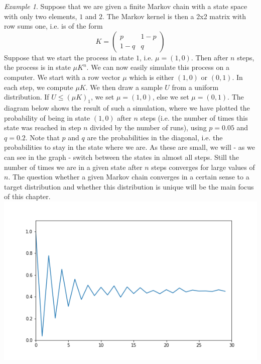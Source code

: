 \documentclass[a4paper, draft]{article}
\theoremstyle{own}
\theoremstyle{remark}
\newtheorem{example}{Example}[section]
\begin{document}
\begin{example}
Suppose that we are given a finite Markov chain with a state space with only two elements, $1$ and $2$. The Markov kernel is then a 2x2 matrix with row sums one, i.e. is of the form
$$
K = \begin{pmatrix} p & 1-p \\ 1-q & q \end{pmatrix}
$$
Suppose that we start the process in state $1$, i.e. $\mu = (1,0)$. Then after $n$ steps, the process is in state $\mu K^n$. We can now easily simulate this process on a computer. We start with a row vector $\mu$ which is either $(1,0)$ or $(0,1)$. In each step, we compute $\mu K$. We then draw a sample $U$ from a uniform distribution. If $U \leq (\mu K)_1$, we set $\mu = (1,0)$, else we set $\mu = (0,1)$.  The diagram below shows the result of such a simulation, where we have plotted the probability of being in state $(1,0)$ after $n$ steps (i.e. the number of times this state was reached in step $n$ divided by the number of runs), using $p = 0.05$ and $q = 0.2$. Note that $p$ and $q$ are the probabilities in the diagonal, i.e. the probabilities to stay in the state where we are. As these are small, we will - as we can see in the graph - switch between the states in almost all steps. Still the number of times we are in a given state after $n$ steps converges for large values of $n$. The question whether a given Markov chain converges in a certain sense to a target distribution and whether this distribution is unique will be the main focus of this chapter.
\includegraphics[scale=.55]{TwoDimensionalMarkovChainSample.png}
\end{example}
\end{document}
